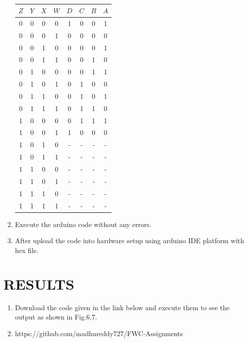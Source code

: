 \documentclass[conference]{IEEEtran}
\begin{document}
\begin{enumerate}
\begin{table}[htbp]
    \centering
\begin{tabular}
{ | c | c | c | c | c | c | c | c | } \hline
$Z$ & $Y$ & $X$ & $W$ & $D$ & $C$ & $B$ & $A$\\\hline
0   & 0   & 0   & 0   & 1  & 0 & 0  & 1 \\
0   & 0   & 0   & 1   & 0  & 0 & 0  & 0 \\
0   & 0   & 1   & 0   & 0  & 0 & 0  & 1 \\
0   & 0   & 1   & 1   & 0  & 0 & 1  & 0 \\
0   & 1   & 0   & 0   & 0  & 0 & 1  & 1 \\  
0   & 1   & 0   & 1   & 0  & 1 & 0  & 0 \\
0   & 1   & 1   & 0   & 0  & 1 & 0  & 1 \\  
0   & 1   & 1   & 1   & 0  & 1 & 1  & 0 \\
1   & 0   & 0   & 0   & 0  & 1 & 1  & 1 \\
1   & 0   & 0   & 1   & 1  & 0 & 0  & 0 \\
1   & 0   & 1   & 0   & -  & - & -  & - \\ 
1   & 0   & 1   & 1   & -  & - & -  & - \\
1   & 1   & 0   & 0   & -  & - & -  & - \\
1   & 1   & 0   & 1   & -  & - & -  & - \\
1   & 1   & 1   & 0   & -  & - & -  & - \\
1   & 1   & 1   & 1   & -  & - & -  & - \\ \hline
\end{tabular}
\vspace{0.1cm}
\caption{\label{tab:widgets}}
\end{table}
	
\item Execute the arduino code without any errors.
\item After upload the code into hardware setup using arduino IDE platform with hex file.
 \end{enumerate}

\section{RESULTS}
 \begin{enumerate}
	 \item Download the code given in the link below and execute them to see the output as shown in Fig.6,7. 
	 \item https://github.com/madhureddy727/FWC-Assignments
 \end{enumerate}
\end{document}
